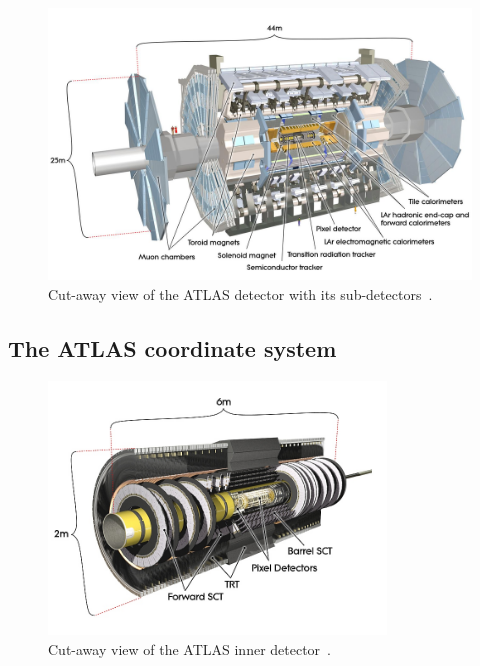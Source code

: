 \begin{figure}[tp]
     \begin{center}

            \includegraphics[width=\textwidth]{figure/ATLAS.jpeg}

    \end{center}
    \caption{Cut-away view of the ATLAS detector with its sub-detectors~\cite{ATLASDetector}.}



   \label{fig:atlas}
\end{figure}


\subsection{The ATLAS coordinate system}
\begin{figure}[!tp]
     \begin{center}

            \includegraphics[width=0.8\textwidth]{figure/Inner_detector.jpg}

    \end{center}
    \caption{Cut-away view of the ATLAS inner detector~\cite{ATLASDetector}.}

   \label{fig:atlasID}
\end{figure}

